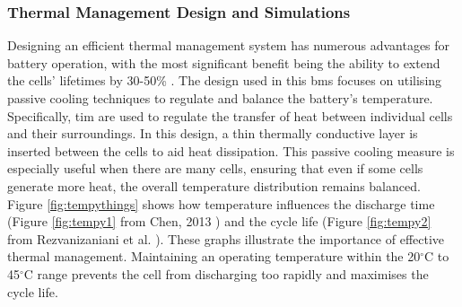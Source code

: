 \subsubsection{Thermal Management Design and Simulations}

Designing an efficient thermal management system has numerous advantages for battery operation, with the most significant benefit being the ability to extend the cells' lifetimes by 30-50\% \cite{TOGUN20251077}. The design used in this \gls{bms} focuses on utilising passive cooling techniques to regulate and balance the battery's temperature. Specifically, \gls{tim} are used to regulate the transfer of heat between individual cells and their surroundings. In this design, a thin thermally conductive layer is inserted between the cells to aid heat dissipation. This passive cooling measure is especially useful when there are many cells, ensuring that even if some cells generate more heat, the overall temperature distribution remains balanced. Figure \ref{fig:tempythings} shows how temperature influences the discharge time (Figure \ref{fig:tempy1} from Chen, 2013 \cite{chen2013heat}) and the cycle life (Figure \ref{fig:tempy2} from Rezvanizaniani et al. \cite{REZVANIZANIANI2014110}). These graphs illustrate the importance of effective thermal management. Maintaining an operating temperature within the 20$^\circ\text{C}$ to 45$^\circ\text{C}$ range prevents the cell from discharging too rapidly and maximises the cycle life.

